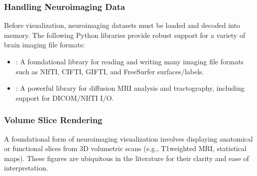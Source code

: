 \documentclass[letterpaper,10pt,english]{jupyterBook}
\begin{document}
\subsubsection{Handling Neuroimaging Data}
\label{\detokenize{chapters/03/03b_visualization-tools:handling-neuroimaging-data}}
\sphinxAtStartPar
Before visualization, neuroimaging datasets must be loaded and decoded into memory. The following Python libraries provide robust support for a variety of brain imaging file formats:
\begin{itemize}
\item {} 
\sphinxAtStartPar
{}: A foundational library for reading and writing many imaging file formats such as NIfTI, CIFTI, GIFTI, and FreeSurfer surfaces/labels.

\item {} 
\sphinxAtStartPar
{}: A powerful library for diffusion MRI analysis and tractography, including support for DICOM/NIfTI I/O.

\end{itemize}


\subsubsection{Volume Slice Rendering}
\label{\detokenize{chapters/03/03b_visualization-tools:volume-slice-rendering}}
\sphinxAtStartPar
A foundational form of neuroimaging visualization involves displaying anatomical or functional slices from 3D volumetric scans (e.g., T1\sphinxhyphen{}weighted MRI, statistical maps). These figures are ubiquitous in the literature for their clarity and ease of interpretation.
\end{document}
